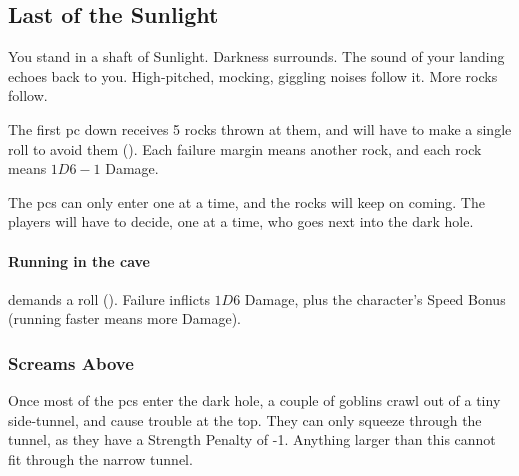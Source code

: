 \begin{multicols}{2}

\subsection{Last of the Sunlight}

\begin{boxtext}
  You stand in a shaft of Sunlight.
  Darkness surrounds.
  The sound of your landing echoes back to you.
  High-pitched, mocking, giggling noises follow it.
  More rocks follow.
\end{boxtext}

The first \gls{pc} down receives 5 rocks thrown at them, and will have to make a single  roll to avoid them (\tn[10]).
Each failure margin means another rock, and each rock means $1D6-1$ Damage.

The \glspl{pc} can only enter one at a time, and the rocks will keep on coming.
The players will have to decide, one at a time, who goes next into the dark hole.


\paragraph{Running in the cave}
demands a  roll (\tn[12]).
Failure inflicts $1D6$ Damage, plus the character's Speed Bonus (running faster means more Damage).

\subsubsection{Screams Above}

Once most of the \glspl{pc} enter the dark hole, a couple of goblins crawl out of a tiny side-tunnel, and cause trouble at the top.
They can only squeeze through the tunnel, as they have a Strength Penalty of -1.
Anything larger than this cannot fit through the narrow tunnel.


\end{multicols}
